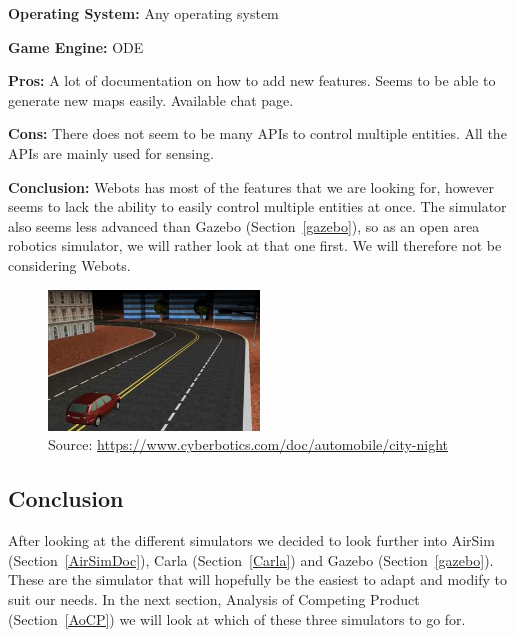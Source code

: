 \textbf{Operating System:} Any operating system

\textbf{Game Engine:} ODE

\textbf{Pros:} A lot of documentation on how to add new features. Seems to be able to generate new maps easily. Available chat page.

\textbf{Cons:} There does not seem to be many APIs to control multiple entities. All the APIs are mainly used for sensing. 

\textbf{Conclusion:} Webots has most of the features that we are looking for, however seems to lack the ability to easily control multiple entities at once. The simulator also seems less advanced than Gazebo (Section~\ref{gazebo}), so as an open area robotics simulator, we will rather look at that one first. We will therefore not be considering Webots.

\begin{figure}[H]
    \centering
    \includegraphics[width=0.5\textwidth]{Simulators/Webots.jpg}
    \caption{Source: \url{https://www.cyberbotics.com/doc/automobile/city-night}}
\end{figure}

\subsection{Conclusion}
After looking at the different simulators we decided to look further into AirSim (Section~\ref{AirSimDoc}), Carla (Section~\ref{Carla}) and Gazebo (Section~\ref{gazebo}). These are the simulator that will hopefully be the easiest to adapt and modify to suit our needs. In the next section, Analysis of Competing Product (Section~\ref{AoCP}) we will look at which of these three simulators to go for. 
